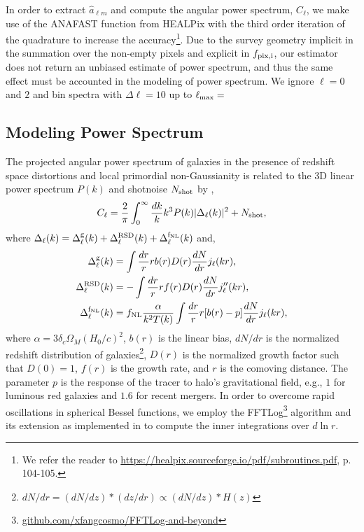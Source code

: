 In order to extract $\hat{a}_{\ell m}$  and compute the angular power spectrum, $C_{\ell}$, we make use of the ANAFAST function from HEALPix \citep{gorski2005healpix} with the third order iteration of the quadrature to increase the accuracy\footnote{We refer the reader to \url{https://healpix.sourceforge.io/pdf/subroutines.pdf}, p. 104-105.}. Due to the survey geometry implicit in the summation over the non-empty pixels and explicit in $f_{\rm pix, i}$, our estimator does not return an unbiased estimate of power spectrum, and thus the same effect must be accounted in the modeling of power spectrum. We ignore $\ell=0$ and $2$ and bin spectra with $\Delta \ell=10$ up to $\ell_{\rm max}=$\\ 

\subsection{Modeling Power Spectrum}
The projected angular power spectrum of galaxies in the presence of redshift space distortions and local primordial non-Gaussianity is related to the 3D linear power spectrum $P(k)$ and shotnoise $N_{\rm shot}$ by \citep[see, e.g.,][]{slosar2008constraints},
\begin{equation}\label{eq:cell}
    C_{\ell} = \frac{2}{\pi}\int_{0}^{\infty}\frac{dk}{k}k^{3}P(k)|\Delta_{\ell}(k)|^{2} + N_{\rm shot},
\end{equation}
where $\Delta_{\ell}(k) = \Delta^{\rm g}_{\ell}(k) + \Delta^{\rm RSD}_{\ell}(k) + \Delta^{\rm f_{NL}}_{\ell}(k)$ and,
\begin{align}
    \Delta^{\rm g}_{\ell}(k) &= \int \frac{dr}{r} r b(r) D(r) \frac{dN}{dr} j_{\ell}(kr),\\
    \Delta^{\rm RSD}_{\ell}(k) &= - \int \frac{dr}{r} r f(r) D(r) \frac{dN}{dr} j^{\prime\prime}_{\ell}(kr),\\
    \Delta^{\rm f_{NL}}_{\ell}(k) &= f_{\rm NL} \frac{\alpha}{k^{2}T(k)} \int \frac{dr}{r} r [b(r)-p] \frac{dN}{dr} j_{\ell}(kr),
\end{align}
where $\alpha=3\delta_{c}\Omega_{M}(H_{0}/c)^{2}$, $b(r)$ is the linear bias, $dN/dr$ is the normalized redshift distribution of galaxies\footnote{$dN/dr = (dN/dz)*(dz/dr) \propto (dN/dz)*H(z)$}, $D(r)$ is the normalized growth factor such that $D(0)=1$, $f(r)$ is the growth rate, and $r$ is the comoving distance. The parameter $p$ is the response of the tracer to halo's gravitational field, e.g., $1$ for luminous red galaxies and $1.6$ for recent mergers. In order to overcome rapid oscillations in spherical Bessel functions, we employ the FFTLog\footnote{\href{https://github.com/xfangcosmo/FFTLog-and-beyond}{github.com/xfangcosmo/FFTLog-and-beyond}} algorithm and its extension as implemented in \cite{fang2020JCAP...05..010F} to compute the inner integrations over $d\ln r$.


